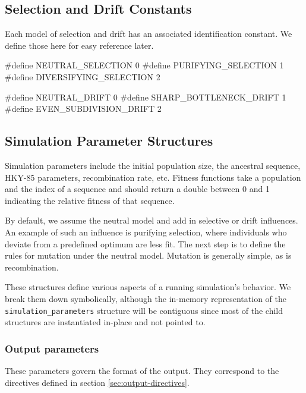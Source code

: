 \documentclass{article}
\begin{document}
    \subsection{Selection and Drift Constants}
      \label{sec:selection-drift-constants}

      Each model of selection and drift has an associated identification
      constant. We define those here for easy reference later.

\begin{ccode}
#define NEUTRAL_SELECTION 0
#define PURIFYING_SELECTION 1
#define DIVERSIFYING_SELECTION 2

#define NEUTRAL_DRIFT 0
#define SHARP_BOTTLENECK_DRIFT 1
#define EVEN_SUBDIVISION_DRIFT 2
\end{ccode}

    \subsection{Simulation Parameter Structures}
      \label{sec:full-simulation-parameters}

      Simulation parameters include the initial population size, the ancestral
      sequence, HKY-85 parameters, recombination rate, etc. Fitness functions
      take a population and the index of a sequence and should return a double
      between 0 and 1 indicating the relative fitness of that sequence.

      By default, we assume the neutral model and add in selective or drift
      influences. An example of such an influence is purifying selection, where
      individuals who deviate from a predefined optimum are less fit. The next
      step is to define the rules for mutation under the neutral model. Mutation
      is generally simple, as is recombination.

      These structures define various aspects of a running simulation's
      behavior. We break them down symbolically, although the in-memory
      representation of the \verb|simulation_parameters| structure will be
      contiguous since most of the child structures are instantiated in-place
      and not pointed to.

      \subsubsection{Output parameters}
	\label{sec:output-parameters}

	These parameters govern the format of the output. They correspond to the
	directives defined in section \ref{sec:output-directives}.
\end{document}
